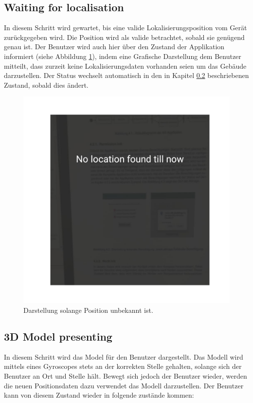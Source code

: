 \documentclass[a4paper]{scrreprt}
\begin{document}
\subsection{Waiting for localisation} \label{ch:waitingForLocation}
In diesem Schritt wird gewartet, bis eine valide Lokalisierungsposition vom Gerät zurückgegeben wird. Die Position wird als valide betrachtet, sobald sie genügend genau ist. Der Benutzer wird auch hier über den Zustand der Applikation informiert (siehe Abbildung \ref{fig:KoordinationNotFound}), indem eine Grafische Darstellung dem Benutzer mitteilt, dass zurzeit keine Lokalisierungsdaten vorhanden seien um das Gebäude darzustellen. Der Status wechselt automatisch in den in Kapitel \ref{ch:ThreeDModelPresenting} beschriebenen Zustand, sobald dies ändert.

\begin{figure}[h!]
	\includegraphics[keepaspectratio, width=\textwidth]{UnknownLocation.png}
	\caption{Darstellung solange Position unbekannt ist.}
    \label{fig:KoordinationNotFound}
\end{figure}


\subsection{3D Model presenting} \label{ch:ThreeDModelPresenting}
In diesem Schritt wird das Model für den Benutzer dargestellt. Das Modell wird mittels eines Gyroscopes stets an der korrekten Stelle gehalten, solange sich der Benutzer an Ort und Stelle hält. Bewegt sich jedoch der Benutzer wieder, werden die neuen Positionsdaten dazu verwendet das Modell darzustellen.
Der Benutzer kann von diesem Zustand wieder in folgende zustände kommen:
\end{document}

